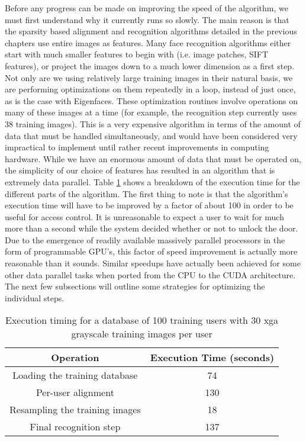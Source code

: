 Before any progress can be made on improving the speed of the algorithm, we must first understand why it currently runs so slowly. The main reason is that the sparsity based alignment and recognition algorithms detailed in the previous chapters use entire images as features.  Many face recognition algorithms either start with much smaller features to begin with (i.e. image patches, SIFT features), or project the images down to a much lower dimension as a first step.  Not only are we using relatively large training images in their natural basis, we are performing optimizations on them repeatedly in a loop, instead of just once, as is the case with Eigenfaces.   These optimization routines involve operations on many of these images at a time (for example, the recognition step currently uses 38 training images).  This is a very expensive algorithm in terms of the amount of data that must be handled simultaneously, and would have been considered very impractical to implement until rather recent improvements in computing hardware.  While we have an enormous amount of data that must be operated on, the simplicity of our choice of features has resulted in an algorithm that is extremely data parallel.  Table \ref{tab:breakdown} shows a breakdown of the execution time for the different parts of the algorithm.  The first thing to note is that the algorithm's execution time will have to be improved by a factor of about 100 in order to be useful for access control.  It is unreasonable to expect a user to wait for much more than a second while the system decided whether or not to unlock the door.  Due to the emergence of readily available massively parallel processors in the form of programmable GPU's, this factor of speed improvement is actually more reasonable than it sounds.  Similar speedups have actually been achieved for some other data parallel tasks when ported from the CPU to the CUDA architecture.  The next few subsections will outline some strategies for optimizing the individual steps.
\begin{table}[h]
\centering
\begin{tabular}{|c|c|}
\hline
Operation & Execution Time (seconds)\\
\hline
Loading the training database & 74\\
\hline
Per-user alignment & 130\\
\hline
Resampling the training images & 18\\
\hline
Final recognition step &137\\
\hline
\end{tabular}\vspace{2mm}
\caption{Execution timing for a database of 100 training users with 30 xga grayscale training images per user} \label{tab:breakdown}
\end{table}

